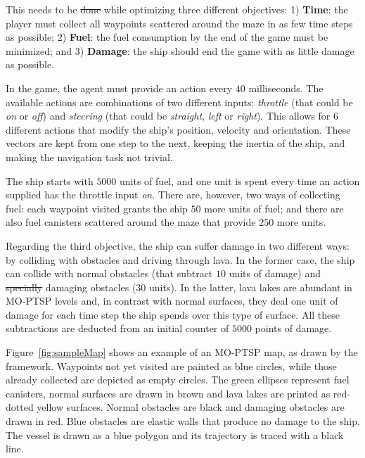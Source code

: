 \documentclass[journal]{IEEEtran}
\providecommand{\DIFaddtex}[1]{{\protect\color{blue}\uwave{#1}}} %
\providecommand{\DIFdeltex}[1]{{\protect\color{red}\sout{#1}}}                      %
\providecommand{\DIFaddbegin}{} %
\providecommand{\DIFaddend}{} %
\providecommand{\DIFdelbegin}{} %
\providecommand{\DIFdelend}{} %
\providecommand{\DIFadd}[1]{\texorpdfstring{\DIFaddtex{#1}}{#1}} %
\providecommand{\DIFdel}[1]{\texorpdfstring{\DIFdeltex{#1}}{}} %
\begin{document}
This needs to be \DIFdelbegin \DIFdel{done }\DIFdelend \DIFaddbegin \DIFadd{accomplished }\DIFaddend while optimizing three different objectives:  1) \textbf{Time}: the player must collect all waypoints scattered around the maze in as few time steps as possible; 2) \textbf{Fuel}: the fuel consumption by the end of the game must be minimized; and 3) \textbf{Damage}: the ship should end the game with as little damage as possible.

In the game, the agent must provide an action every $40$ milliseconds. The available actions are combinations of two different inputs: \textit{throttle} (that could be \textit{on} or \textit{off}) and \textit{steering} (that could be \textit{straight}, \textit{left} or \textit{right}). This allows for $6$ different actions that modify the ship's position, velocity and orientation. These vectors are kept from one step to the next, keeping the inertia of the ship, and making the navigation task not trivial. 

The ship starts with $5000$ units of fuel, and one unit is spent every time an action supplied has the throttle input \textit{on}. There are, however, two ways of collecting fuel: each waypoint visited grants the ship $50$ more units of fuel; and there are also fuel canisters scattered around the maze that provide $250$ more units.

Regarding the third objective, the ship can suffer damage in two different ways: by colliding with obstacles and driving through lava. In the former case, the ship can collide with normal obstacles (that subtract $10$ units of damage) and \DIFdelbegin \DIFdel{specially }\DIFdelend \DIFaddbegin \DIFadd{especially }\DIFaddend damaging obstacles ($30$ units). In the latter, lava lakes are abundant in MO-PTSP levels and, in contrast with normal surfaces, they deal one unit of damage for each time step the ship spends over this type of surface. All these subtractions are deducted from an initial counter of $5000$ points of damage.

Figure~\ref{fig:sampleMap} shows an example of an MO-PTSP map, as drawn by the framework. Waypoints not yet visited are painted as blue circles, while those already collected are depicted as empty circles. The green ellipses represent fuel canisters, normal surfaces are drawn in brown and lava lakes are printed as red-dotted yellow surfaces. Normal obstacles are black and damaging obstacles are drawn in red. Blue obstacles are elastic walls that produce no damage to the ship. The vessel is drawn as a blue polygon and its trajectory is traced with a black line.
\end{document}
